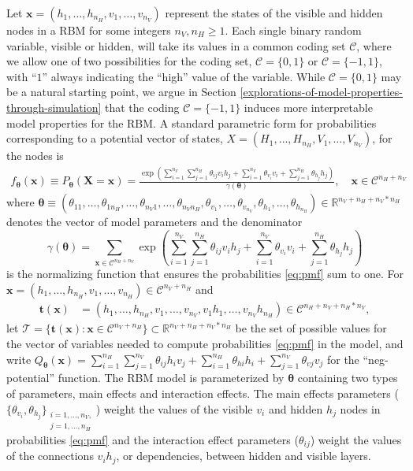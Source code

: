 \documentclass[]{article}
\theoremstyle{definition}
\newcommand{\nv}{{n_{\scriptscriptstyle V}}}
\newcommand{\nh}{{n_{\scriptscriptstyle H}}}
\begin{document}
Let \(\boldsymbol x = (h_1, \dots, h_\nh, v_1,\dots,v_\nv)\) represent
the states of the visible and hidden nodes in a RBM for some integers
\(\nv, \nh \ge 1\). Each single binary random variable, visible or
hidden, will take its values in a common coding set \(\mathcal{C}\),
where we allow one of two possibilities for the coding set,
\(\mathcal{C}=\{0,1\}\) or \(\mathcal{C}=\{-1,1\}\), with ``\(1\)''
always indicating the ``high'' value of the variable. While
\(\mathcal{C}=\{0,1\}\) may be a natural starting point, we argue in
Section \ref{explorations-of-model-properties-through-simulation} that
the coding \(\mathcal{C}=\{-1,1\}\) induces more interpretable model
properties for the RBM. A standard parametric form for probabilities
corresponding to a potential vector of states,
\(X = (H_1, \dots, H_\nh, V_1,\dots,V_\nv)\), for the nodes is
\begin{align}
\label{eq:pmf}
f_{\boldsymbol \theta} (\boldsymbol x)\equiv P_{\boldsymbol \theta}(\boldsymbol X = \boldsymbol x) = \frac{\exp\left(\sum\limits_{i = 1}^\nv \sum\limits_{j=1}^\nh \theta_{ij} v_i h_j + \sum\limits_{i = 1}^\nv\theta_{v_i} v_i + \sum\limits_{j = 1}^\nh\theta_{h_j} h_j\right)}{\gamma(\boldsymbol \theta)}, \quad \boldsymbol x \in \mathcal{C}^{\nh + \nv} 
\end{align} where
\(\boldsymbol \theta \equiv (\theta_{11}, \dots, \theta_{1\nh}, \dots, \theta_{\nv 1}, \dots, \theta_{\nv \nh}, \theta_{v_1}, \dots, \theta_{v_\nv}, \theta_{h_1}, \dots, \theta_{h_\nh}) \in \mathbb{R}^{\nv + \nh + \nv*\nh}\)
denotes the vector of model parameters and the denominator \[
\gamma(\boldsymbol \theta) = \sum_{\boldsymbol x \in \mathcal{C}^{\nh+\nv}}\exp\left(\sum_{i = 1}^\nv \sum_{j=1}^\nh \theta_{ij} v_i h_j + \sum_{i = 1}^\nv\theta_{v_i} v_i + \sum_{j = 1}^\nh\theta_{h_j} h_j\right)
\] is the normalizing function that ensures the probabilities
\eqref{eq:pmf} sum to one. For
\(\boldsymbol x = (h_1, \dots, h_\nh, v_1, \dots, v_\nh) \in \mathcal{C}^{\nv + \nh}\)
and \begin{align}
\boldsymbol t(\boldsymbol x) &= (h_1, \dots, h_\nh, v_1, \dots, v_\nv, v_1 h_1, \dots, v_\nv h_\nh) \in \mathcal{C}^{\nh + \nv + \nh*\nv}, \label{eq:t}
\end{align} let
\(\mathcal{T} = \{\boldsymbol t(\boldsymbol x): \boldsymbol x \in \mathcal{C}^{\nv + \nh}\} \subset \mathbb{R}^{\nv + \nh + \nv * \nh}\)
be the set of possible values for the vector of variables needed to
compute probabilities \eqref{eq:pmf} in the model, and write
\(Q_{\boldsymbol \theta}(\boldsymbol x) = \sum\limits_{i = 1}^\nh\sum\limits_{j=1}^\nv \theta_{ij} h_i v_j + \sum\limits_{i = 1}^\nh\theta_{hi} h_i + \sum\limits_{j = 1}^\nv\theta_{vj} v_j\)
for the ``neg-potential'' function. The RBM model is parameterized by
\(\boldsymbol \theta\) containing two types of parameters, main effects
and interaction effects. The main effects parameters
(\(\{\theta_{v_i}, \theta_{h_j}\}_{\substack{i = 1, \dots, \nv,\\j = 1, \dots, \nh}}\))
weight the values of the visible \(v_i\) and hidden \(h_j\) nodes in
probabilities \eqref{eq:pmf} and the interaction effect parameters
(\(\theta_{ij}\)) weight the values of the connections \(v_i h_j\), or
dependencies, between hidden and visible layers.
\end{document}
